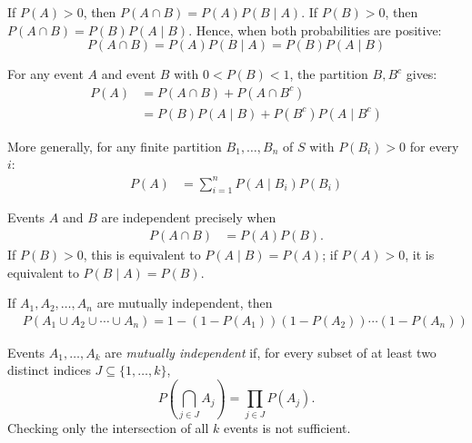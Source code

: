 \begin{theorem}
    If $P(A)>0$, then $P(A\cap B)=P(A)P(B\mid A)$. If $P(B)>0$, then $P(A\cap B)=P(B)P(A\mid B)$. Hence, when both probabilities are positive:
    \[
    P(A \cap B) = P(A) P(B \mid A) = P(B) P(A \mid B)
    \]
\end{theorem}

\begin{theorem}
For any event \(A\) and event \(B\) with $0<P(B)<1$, the partition $B,B^c$ gives:
    \begin{align*}
    P(A) &= P(A \cap B) + P(A \cap B^c) \\
    &= P(B) P(A \mid B) + P(B^c) P(A \mid B^c)
    \end{align*}

    More generally, for any finite partition \(B_1,\ldots,B_n\) of $S$ with $P(B_i)>0$ for every $i$:
    \begin{align*}
    P(A) &= \sum_{i=1}^{n} P(A \mid B_i) P(B_i)
    \end{align*}
\end{theorem}

\begin{definition}[Independence]
    Events \(A\) and \(B\) are independent precisely when
    \begin{align*}
        P(A \cap B) &= P(A)P(B).
    \end{align*}
    If $P(B)>0$, this is equivalent to $P(A\mid B)=P(A)$; if $P(A)>0$, it is equivalent to $P(B\mid A)=P(B)$.
\end{definition}

\begin{theorem}
        If \( A_1, A_2, \ldots, A_n \) are mutually independent, then
        \begin{align*}
        &P\left(A_1 \cup A_2 \cup \cdots \cup A_n\right)=1-\left(1-P\left(A_1\right)\right)\left(1-P\left(A_2\right)\right) \cdots\left(1-P\left(A_n\right)\right)
        \end{align*}
\end{theorem}

\begin{definition}
    Events \(A_1,\ldots,A_k\) are \emph{mutually independent} if, for every subset of at least two distinct indices $J\subseteq\{1,\ldots,k\}$,
    \[
      P\!\left(\bigcap_{j\in J}A_j\right)=\prod_{j\in J}P(A_j).
    \]
    Checking only the intersection of all $k$ events is not sufficient.
\end{definition}

